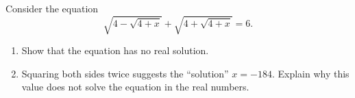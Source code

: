 Consider the equation
\[
\sqrt{4-\sqrt{4+x}}+\sqrt{4+\sqrt{4+x}}=6 .
\]
\begin{enumerate}
\item[(a)] Show that the equation has no real solution.
\item[(b)] Squaring both sides twice suggests the ``solution'' $x=-184$. Explain why this value does not solve the equation in the real numbers.
\end{enumerate}
